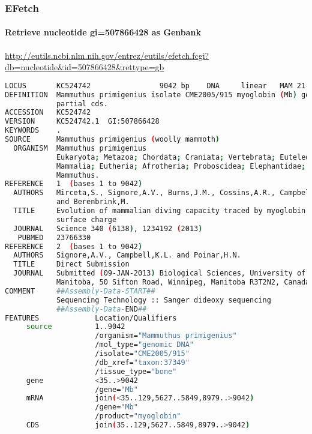 \documentclass{beamer}
\begin{document}
\begin{frame}[fragile]
\frametitle{EFetch}
\framesubtitle{Retrieve nucleotide gi=507866428 as Genbank}
\url{http://eutils.ncbi.nlm.nih.gov/entrez/eutils/efetch.fcgi?db=nucleotide&id=507866428&rettype=gb}
\begin{lstlisting}[language=bash,basicstyle=\tiny,breaklines=false]
LOCUS       KC524742                9042 bp    DNA     linear   MAM 21-JUN-2013
DEFINITION  Mammuthus primigenius isolate CME2005/915 myoglobin (Mb) gene,
            partial cds.
ACCESSION   KC524742
VERSION     KC524742.1  GI:507866428
KEYWORDS    .
SOURCE      Mammuthus primigenius (woolly mammoth)
  ORGANISM  Mammuthus primigenius
            Eukaryota; Metazoa; Chordata; Craniata; Vertebrata; Euteleostomi;
            Mammalia; Eutheria; Afrotheria; Proboscidea; Elephantidae;
            Mammuthus.
REFERENCE   1  (bases 1 to 9042)
  AUTHORS   Mirceta,S., Signore,A.V., Burns,J.M., Cossins,A.R., Campbell,K.L.
            and Berenbrink,M.
  TITLE     Evolution of mammalian diving capacity traced by myoglobin net
            surface charge
  JOURNAL   Science 340 (6138), 1234192 (2013)
   PUBMED   23766330
REFERENCE   2  (bases 1 to 9042)
  AUTHORS   Signore,A.V., Campbell,K.L. and Poinar,H.N.
  TITLE     Direct Submission
  JOURNAL   Submitted (09-JAN-2013) Biological Sciences, University of
            Manitoba, 50 Sifton Road, Winnipeg, Manitoba R3T2N2, Canada
COMMENT     ##Assembly-Data-START##
            Sequencing Technology :: Sanger dideoxy sequencing
            ##Assembly-Data-END##
FEATURES             Location/Qualifiers
     source          1..9042
                     /organism="Mammuthus primigenius"
                     /mol_type="genomic DNA"
                     /isolate="CME2005/915"
                     /db_xref="taxon:37349"
                     /tissue_type="bone"
     gene            <35..>9042
                     /gene="Mb"
     mRNA            join(<35..129,5627..5849,8979..>9042)
                     /gene="Mb"
                     /product="myoglobin"
     CDS             join(35..129,5627..5849,8979..>9042)

\end{lstlisting}
\end{frame}
\end{document}
